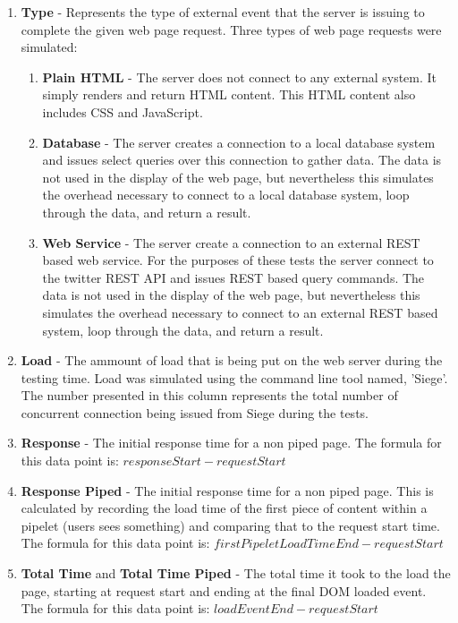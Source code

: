 \documentclass[12pt]{report}
\begin{document}
\begin{enumerate}
\item \textbf{Type} - Represents the type of external event that the server is issuing to complete the given web page request. Three types of web page requests were simulated:
	\begin{enumerate}
	\item \textbf{Plain HTML} - The server does not connect to any external system. It simply renders and return HTML content. This HTML content also includes CSS and JavaScript.
	\item \textbf{Database} - The server creates a connection to a local database system and issues select queries over this connection to gather data. The data is not used in the display of the web page, but nevertheless this simulates the overhead necessary to connect to a local database system, loop through the data, and return a result.
	\item \textbf{Web Service} - The server create a connection to an external REST based web service. For the purposes of these tests the server connect to the twitter REST API and issues REST based query commands. The data is not used in the display of the web page, but nevertheless this simulates the overhead necessary to connect to an external REST based system, loop through the data, and return a result.
	\end{enumerate}
\item \textbf{Load} - The ammount of load that is being put on the web server during the testing time. Load was simulated using the command line tool named, 'Siege'. The number presented in this column represents the total number of concurrent connection being issued from Siege during the tests.
\item \textbf{Response} - The initial response time for a non piped page. The formula for this data point is: \begin{math} responseStart - requestStart \end{math} 
\item \textbf{Response Piped} - The initial response time for a non piped page. This is calculated by recording the load time of the first piece of content within a pipelet (users sees something) and comparing that to the request start time. The formula for this data point is: \begin{math} firstPipeletLoadTimeEnd - requestStart \end{math} 
\item \textbf{Total Time} and \textbf{Total Time Piped}   - The total time it took to the load the page, starting at request start and ending at the final DOM loaded event. The formula for this data point is: \begin{math} loadEventEnd - requestStart \end{math} 
\end{enumerate}
\end{document}
